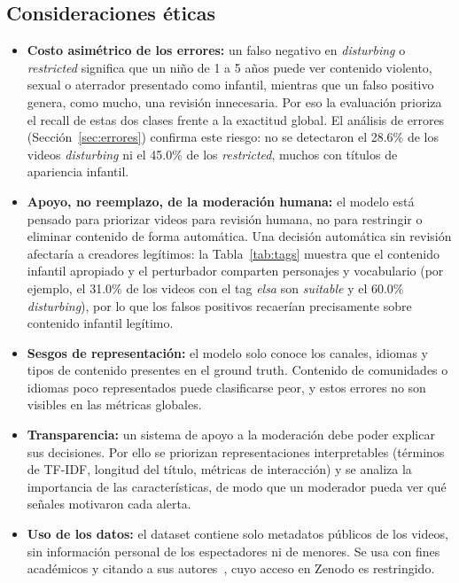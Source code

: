 \documentclass[conference]{IEEEtran}
\begin{document}
\subsection{Consideraciones éticas}\label{sec:etica}
\begin{itemize}
\item \textbf{Costo asimétrico de los errores:} un falso negativo en \textit{disturbing} o \textit{restricted} significa que un niño de 1 a 5 años puede ver contenido violento, sexual o aterrador presentado como infantil, mientras que un falso positivo genera, como mucho, una revisión innecesaria. Por eso la evaluación prioriza el recall de estas dos clases frente a la exactitud global. El análisis de errores (Sección~\ref{sec:errores}) confirma este riesgo: no se detectaron el 28.6\% de los videos \textit{disturbing} ni el 45.0\% de los \textit{restricted}, muchos con títulos de apariencia infantil.
\item \textbf{Apoyo, no reemplazo, de la moderación humana:} el modelo está pensado para priorizar videos para revisión humana, no para restringir o eliminar contenido de forma automática. Una decisión automática sin revisión afectaría a creadores legítimos: la Tabla~\ref{tab:tags} muestra que el contenido infantil apropiado y el perturbador comparten personajes y vocabulario (por ejemplo, el 31.0\% de los videos con el tag \textit{elsa} son \textit{suitable} y el 60.0\% \textit{disturbing}), por lo que los falsos positivos recaerían precisamente sobre contenido infantil legítimo.
\item \textbf{Sesgos de representación:} el modelo solo conoce los canales, idiomas y tipos de contenido presentes en el ground truth. Contenido de comunidades o idiomas poco representados puede clasificarse peor, y estos errores no son visibles en las métricas globales.
\item \textbf{Transparencia:} un sistema de apoyo a la moderación debe poder explicar sus decisiones. Por ello se priorizan representaciones interpretables (términos de TF-IDF, longitud del título, métricas de interacción) y se analiza la importancia de las características, de modo que un moderador pueda ver qué señales motivaron cada alerta.
\item \textbf{Uso de los datos:} el dataset contiene solo metadatos públicos de los videos, sin información personal de los espectadores ni de menores. Se usa con fines académicos y citando a sus autores~\cite{papadamou,papadamou_data}, cuyo acceso en Zenodo es restringido.
\end{itemize}
\end{document}
